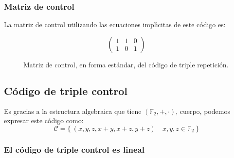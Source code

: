 \subsubsection{Matriz de control}

La matriz de control utilizando las ecuaciones impl\'{\i}citas de este c\'odigo
es:
\begin{figure}[!h]
\begin{displaymath}
\left( \begin{array}{ccc}
1&1&0\\
1&0&1
\end{array} \right)
\end{displaymath}
\caption{Matriz de control, en forma est\'andar, del c\'odigo de triple
repetici\'on.}
\end{figure}

%
%
\subsection{C\'odigo de triple control}

Es gracias a la estructura algebraica que tiene $(\mathbb{F}_2,+,\cdot )$,
cuerpo, podemos expresar este c\'odigo como:
\begin{displaymath}
\mathcal{C}=\{\ (x,y,z,x+y,x+z,y+z)\quad x,y,z\in \mathbb{F}_2\ \}
\end{displaymath}

\subsubsection{El c\'odigo de triple control es lineal}

